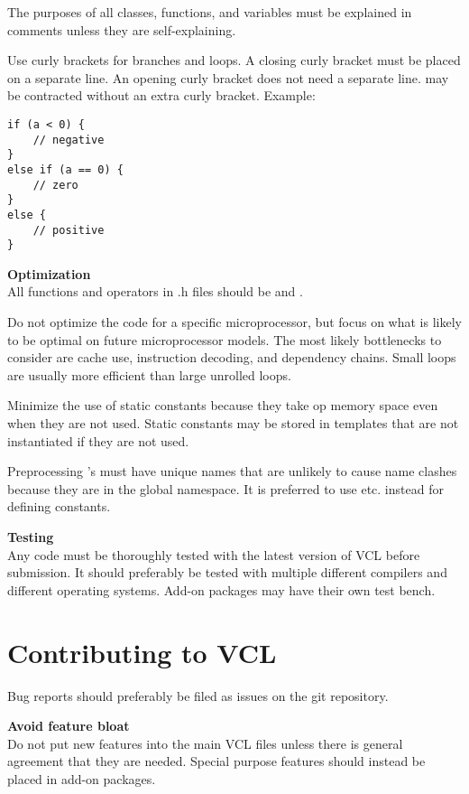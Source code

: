 \documentclass[vcl_manual.tex]{subfiles}
\begin{document}
The purposes of all classes, functions, and variables must be explained in comments unless they are self-explaining.

Use curly brackets for branches and loops. A closing curly bracket must be placed on a separate line. An opening curly bracket does not need a separate line.
 may be contracted without an extra curly bracket. Example:
\begin{lstlisting}[frame=none]
if (a < 0) {
    // negative
}
else if (a == 0) {
    // zero
}
else {
    // positive
}
\end{lstlisting}


\textbf{Optimization}\\

All functions and operators in .h files should be  and .

Do not optimize the code for a specific microprocessor, but focus on what is likely to be optimal on future microprocessor models. The most likely bottlenecks to consider are cache use, instruction decoding, and dependency chains. Small loops are usually more efficient than large unrolled loops.

Minimize the use of static constants because they take op memory space even when they are not used.
Static constants may be stored in templates that are not instantiated if they are not used.

Preprocessing 's must have unique names that are unlikely to cause name clashes because they are in the global namespace. It is preferred to use  etc. instead for defining constants.

\textbf{Testing}\\
Any code must be thoroughly tested with the latest version of VCL before submission.
It should preferably be tested with multiple different compilers and different operating systems.
Add-on packages may have their own test bench.


\section{Contributing to VCL}\label{Contributing}
Bug reports should preferably be filed as issues on the git repository.

\textbf{Avoid feature bloat}\\
Do not put new features into the main VCL files unless there is general agreement that they are needed. Special purpose features should instead be placed in add-on packages.
\end{document}
